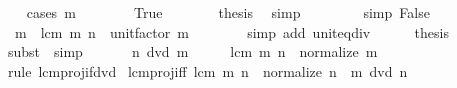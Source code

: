 \begin{isabellebody}
\ \ \isamarkupfalse%
\ {\isacharparenleft}{\kern0pt}cases\ {\isachardoublequoteopen}m\ {\isacharequal}{\kern0pt}\ {}{\isachardoublequoteclose}{\isacharparenright}{\kern0pt}\isanewline
\ \ \ \ \isamarkupfalse%
\ True\isanewline
\ \ \ \ \isamarkupfalse%
\ \isamarkupfalse%
\ {\isacharquery}{\kern0pt}thesis\ \isamarkupfalse%
\ simp\isanewline
\ \ \isamarkupfalse%
\isanewline
\ \ \ \ \isamarkupfalse%
\ {\isacharbrackleft}{\kern0pt}simp{\isacharbrackright}{\kern0pt}{\isacharcolon}{\kern0pt}\ False\isanewline
\ \ \ \ \isamarkupfalse%
\ {\isacharasterisk}{\kern0pt}\ \isamarkupfalse%
\ {\isacharasterisk}{\kern0pt}{\isacharasterisk}{\kern0pt}{\isacharcolon}{\kern0pt}\ {\isachardoublequoteopen}m\ {\isacharequal}{\kern0pt}\ lcm\ m\ n\ {\isacharasterisk}{\kern0pt}\ unit{\isacharunderscore}{\kern0pt}factor\ m{\isachardoublequoteclose}\isanewline
\ \ \ \ \ \ \isamarkupfalse%
\ {\isacharparenleft}{\kern0pt}simp\ add{\isacharcolon}{\kern0pt}\ unit{\isacharunderscore}{\kern0pt}eq{\isacharunderscore}{\kern0pt}div{}{\isacharparenright}{\kern0pt}\isanewline
\ \ \ \ \isamarkupfalse%
\ {\isacharquery}{\kern0pt}thesis\ \isamarkupfalse%
\ {\isacharparenleft}{\kern0pt}subst\ {\isacharasterisk}{\kern0pt}{\isacharasterisk}{\kern0pt}{\isacharparenright}{\kern0pt}\ simp\isanewline
\ \ \isamarkupfalse%
\isanewline
{}\isamarkupfalse%
\isanewline
\ \ \isamarkupfalse%
\ {\isachardoublequoteopen}n\ dvd\ m{\isachardoublequoteclose}\isanewline
\ \ \isamarkupfalse%
\ \isamarkupfalse%
\ {\isachardoublequoteopen}lcm\ m\ n\ {\isacharequal}{\kern0pt}\ normalize\ m{\isachardoublequoteclose}\isanewline
\ \ \ \ \isamarkupfalse%
\ {\isacharparenleft}{\kern0pt}rule\ lcm{\isacharunderscore}{\kern0pt}proj{}{\isacharunderscore}{\kern0pt}if{\isacharunderscore}{\kern0pt}dvd{\isacharparenright}{\kern0pt}\isanewline
{}\isamarkupfalse%
%
\endisatagproof
{\isafoldproof}%
%
\isadelimproof
\isanewline
%
\endisadelimproof
\isanewline
{}\isamarkupfalse%
\ lcm{\isacharunderscore}{\kern0pt}proj{}{\isacharunderscore}{\kern0pt}iff{\isacharcolon}{\kern0pt}\ {\isachardoublequoteopen}lcm\ m\ n\ {\isacharequal}{\kern0pt}\ normalize\ n\ {\isasymlongleftrightarrow}\ m\ dvd\ n{\isachardoublequoteclose}\isanewline
%
\isadelimproof
\ \ %
\endisadelimproof
%

\end{isabellebody}
